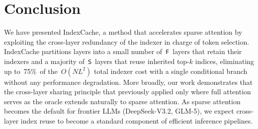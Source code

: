 \section{Conclusion}
\label{sec:conclusion}

We have presented IndexCache, a method that accelerates sparse attention by exploiting the cross-layer redundancy of the indexer in charge of token selection.
IndexCache partitions layers into a small number of~\texttt{F}~layers that retain their indexers and a majority of~\texttt{S}~layers that reuse inherited top-$k$ indices, eliminating up to~75\%\ of the~$O(NL^2)$ total indexer cost with a single conditional branch without any performance degradation.
More broadly, our work demonstrates that the cross-layer sharing principle that previously applied only where full attention serves as the oracle extends naturally to sparse attention.
As sparse attention becomes the default for frontier LLMs (DeepSeek-V3.2, GLM-5), we expect cross-layer index reuse to become a standard component of efficient inference pipelines.
